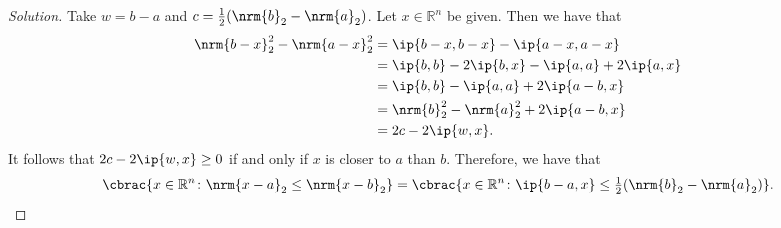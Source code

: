\documentclass[10pt, a4paper, twoside]{amsart}
\newcommand{\R}{\ensuremath{\mathbb{R}}}
\DeclarePairedDelimiter\cbrac\{\}
\DeclarePairedDelimiter{\ip}\langle\rangle
\DeclarePairedDelimiter{\nrm}\lVert\rVert
\renewcommand{\c}{\ensuremath{\colon}}
\newenvironment{solution}
               {\let\oldqedsymbol=\qedsymbol
                \renewcommand{\qedsymbol}{$\blacktriangleleft$}
                \begin{proof}[Solution]}
               {\end{proof}
                \renewcommand{\qedsymbol}{\oldqedsymbol}}
\begin{document}
\begin{solution}
 Take $w=b-a$ and $c=\tfrac{1}{2}(\nrm{b}_2-\nrm{a}_2)$. Let $x \in \R^n$ be given.
 Then we have that 
 \begin{align*}
 \nrm{b-x}_2^2 -\nrm{a-x}_2^2 &= \ip{b-x, b-x}-\ip{a-x, a-x} \\
 &= \ip{b,b}-2\ip{b,x}-\ip{a,a} + 2\ip{a,x} \\
 &= \ip{b,b}-\ip{a,a} + 2\ip{a-b,x} \\
 &= \nrm{b}_2^2-\nrm{a}_2^2 + 2\ip{a-b,x} \\
 &= 2c - 2\ip{w,x}.
 \end{align*}
 It follows that $2c - 2\ip{w,x} \geq 0$ if and only if $x$ is closer to $a$ than $b$.
 Therefore, we have that 
 \begin{equation*}
  \cbrac{x \in \R^n \c \nrm{x-a}_2 \leq \nrm{x-b}_2}=\cbrac{x \in \R^n \c \ip{b-a,x} \leq \tfrac{1}{2}(\nrm{b}_2-\nrm{a}_2)}.
\end{equation*}

 
\end{solution}

 
\end{document}
